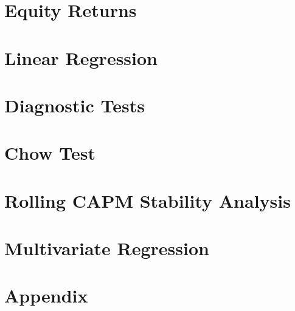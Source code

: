 \documentclass[12pt, openright, oneside]{report}
\begin{document}
\chapter{Equity Returns}\label{chapter:equity_returns}


\chapter{Linear Regression}\label{chapter:linear_regression}


\chapter{Diagnostic Tests}\label{diagnostic_tests}


\chapter{Chow Test}\label{chapter:chow_test}


\chapter{Rolling CAPM Stability Analysis}\label{chapter:rolling}


\chapter{Multivariate Regression}\label{chapter:multivariate}


\chapter{Appendix}
\end{document}
